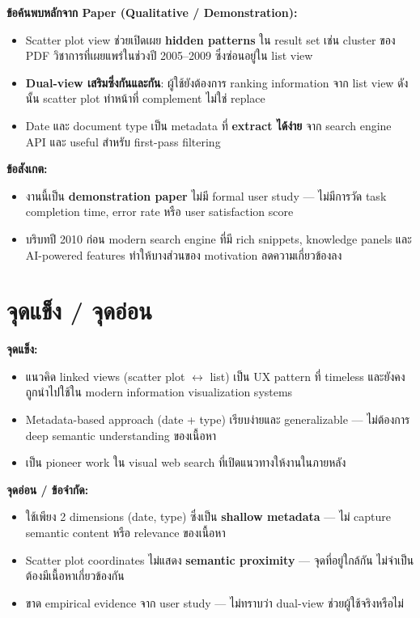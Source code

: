 \documentclass[10pt,a4paper]{article}
\begin{document}
\begin{highlight}
\textbf{ข้อค้นพบหลักจาก Paper (Qualitative / Demonstration):}
\begin{itemize}[nosep]
  \item Scatter plot view ช่วยเปิดเผย \textbf{hidden patterns} ใน result set เช่น cluster
    ของ PDF วิชาการที่เผยแพร่ในช่วงปี 2005--2009 ซึ่งซ่อนอยู่ใน list view
  \item \textbf{Dual-view เสริมซึ่งกันและกัน}: ผู้ใช้ยังต้องการ ranking information จาก
    list view ดังนั้น scatter plot ทำหน้าที่ complement ไม่ใช่ replace
  \item Date และ document type เป็น metadata ที่ \textbf{extract ได้ง่าย} จาก search
    engine API และ useful สำหรับ first-pass filtering
\end{itemize}
\end{highlight}

\vspace{6pt}
\noindent\textbf{ข้อสังเกต:}
\begin{itemize}[nosep, leftmargin=2em]
  \item งานนี้เป็น \textbf{demonstration paper} ไม่มี formal user study --- ไม่มีการวัด
    task completion time, error rate หรือ user satisfaction score
  \item บริบทปี 2010 ก่อน modern search engine ที่มี rich snippets, knowledge panels
    และ AI-powered features ทำให้บางส่วนของ motivation ลดความเกี่ยวข้องลง
\end{itemize}

\section*{จุดแข็ง / จุดอ่อน}

\noindent\textbf{จุดแข็ง:}
\begin{itemize}[nosep, leftmargin=2em]
  \item แนวคิด linked views (scatter plot $\leftrightarrow$ list) เป็น UX pattern ที่ timeless
    และยังคงถูกนำไปใช้ใน modern information visualization systems
  \item Metadata-based approach (date + type) เรียบง่ายและ generalizable --- ไม่ต้องการ
    deep semantic understanding ของเนื้อหา
  \item เป็น pioneer work ใน visual web search ที่เปิดแนวทางให้งานในภายหลัง
\end{itemize}

\vspace{6pt}
\noindent\textbf{จุดอ่อน / ข้อจำกัด:}
\begin{itemize}[nosep, leftmargin=2em]
  \item ใช้เพียง 2 dimensions (date, type) ซึ่งเป็น \textbf{shallow metadata} --- ไม่ capture
    semantic content หรือ relevance ของเนื้อหา
  \item Scatter plot coordinates ไม่แสดง \textbf{semantic proximity} --- จุดที่อยู่ใกล้กัน
    ไม่จำเป็นต้องมีเนื้อหาเกี่ยวข้องกัน
  \item ขาด empirical evidence จาก user study --- ไม่ทราบว่า dual-view ช่วยผู้ใช้จริงหรือไม่
\end{itemize}
\end{document}
